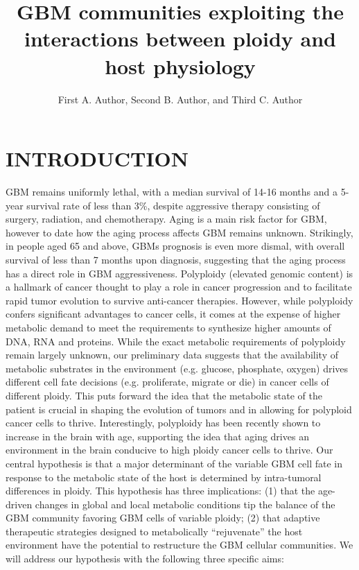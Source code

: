 \documentclass[times,twoside]{zHenriquesLab-StyleBioRxiv}
\begin{document}
\title{GBM communities exploiting the interactions between ploidy and host physiology}
\author{ First A. Author, Second B. Author, and Third C. Author }



\maketitle


\section*{INTRODUCTION}
GBM remains uniformly lethal, with a median survival of 14-16 months and a 5-year survival rate of less than 3\%, despite aggressive therapy consisting of surgery, radiation, and chemotherapy. Aging is a main risk factor for GBM, however to date how the aging process affects GBM remains unknown. Strikingly, in people aged 65 and above, GBMs prognosis is even more dismal, with overall survival of less than 7 months upon diagnosis, suggesting that the aging process has a direct role in GBM aggressiveness. Polyploidy (elevated genomic content) is a hallmark of cancer thought to play a role in cancer progression and to facilitate rapid tumor evolution to survive anti-cancer therapies. However, while polyploidy confers significant advantages to cancer cells, it comes at the expense of higher metabolic demand to meet the requirements to synthesize higher amounts of DNA, RNA and proteins. While the exact metabolic requirements of polyploidy remain largely unknown, our preliminary data suggests that the availability of metabolic substrates in the environment (e.g. glucose, phosphate, oxygen) drives different cell fate decisions (e.g. proliferate, migrate or die) in cancer cells of different ploidy. This puts forward the idea that the metabolic state of the patient is crucial in shaping the evolution of tumors and in allowing for polyploid cancer cells to thrive. Interestingly, polyploidy has been recently shown to increase in the brain with age, supporting the idea that aging drives an environment in the brain conducive to high ploidy cancer cells to thrive. Our central hypothesis is that a major determinant of the variable GBM cell fate in response to the metabolic state of the host is determined by intra-tumoral differences in ploidy. This hypothesis has three implications: (1) that the age-driven changes in global and local metabolic conditions tip the balance of the GBM community favoring GBM cells of variable ploidy; (2) that adaptive therapeutic strategies designed to metabolically “rejuvenate” the host environment have the potential to restructure the GBM cellular communities. We will address our hypothesis with the following three specific aims:
\end{document}
